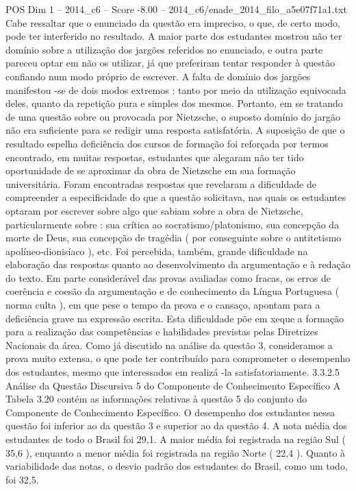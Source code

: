 \begin{textsample}{POS Dim 1 – 2014\_c6 – Score -8.00 – 2014\_c6/enade\_2014\_filo\_a5e07f71a1.txt}
Cabe ressaltar que o enunciado da questão era impreciso, o que, de certo modo, pode ter interferido no resultado.
A maior parte dos estudantes mostrou não ter domínio sobre a utilização dos jargões referidos no enunciado, e outra parte pareceu optar em não os utilizar, já que preferiram tentar responder à questão confiando num modo próprio de escrever.
A falta de domínio dos jargões manifestou -se de dois modos extremos : tanto por meio da utilização equivocada deles, quanto da repetição pura e simples dos mesmos.
Portanto, em se tratando de uma questão sobre ou provocada por Nietzsche, o suposto domínio do jargão não era suficiente para se redigir uma resposta satisfatória.
A suposição de que o resultado espelha deficiência dos cursos de formação foi reforçada por termos encontrado, em muitas respostas, estudantes que alegaram não ter tido oportunidade de se aproximar da obra de Nietzsche em sua formação universitária.
Foram encontradas respostas que revelaram a dificuldade de compreender a especificidade do que a questão solicitava, nas quais os estudantes optaram por escrever sobre algo que sabiam sobre a obra de Nietzsche, particularmente sobre : sua crítica ao socratismo/platonismo, sua concepção da morte de Deus, sua concepção de tragédia ( por conseguinte sobre o antitetismo apolíneo-dionisíaco ), etc.
Foi percebida, também, grande dificuldade na elaboração das respostas quanto ao desenvolvimento da argumentação e à redação do texto.
Em parte considerável das provas avaliadas como fracas, os erros de coerência e coesão da argumentação e de conhecimento da Língua Portuguesa ( norma culta ), em que pese o tempo da prova e o cansaço, apontam para a deficiência grave na expressão escrita.
Esta dificuldade põe em xeque a formação para a realização das competências e habilidades previstas pelas Diretrizes Nacionais da área.
Como já discutido na análise da questão 3, consideramos a prova muito extensa, o que pode ter contribuído para comprometer o desempenho dos estudantes, mesmo que interessados em realizá -la satisfatoriamente. 3.3.2.5 Análise da Questão Discursiva 5 do Componente de Conhecimento Específico A Tabela 3.20 contém as informações relativas à questão 5 do conjunto do Componente de Conhecimento Específico.
O desempenho dos estudantes nessa questão foi inferior ao da questão 3 e superior ao da questão 4.
A nota média dos estudantes de todo o Brasil foi 29,1.
A maior média foi registrada na região Sul ( 35,6 ), enquanto a menor média foi registrada na região Norte ( 22,4 ).
Quanto à variabilidade das notas, o desvio padrão dos estudantes do Brasil, como um todo, foi 32,5.

\end{textsample}
